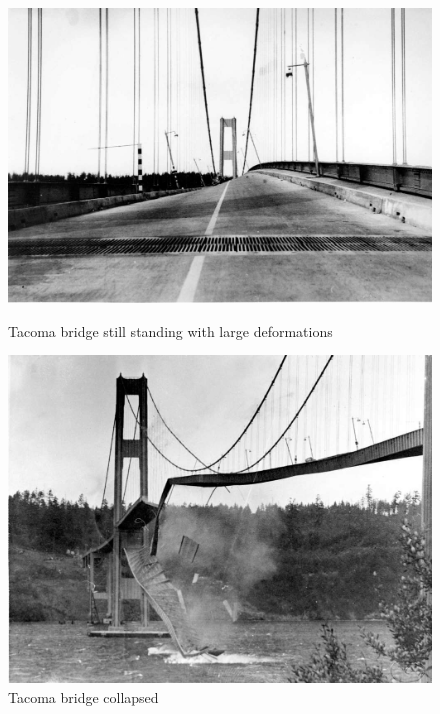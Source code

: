 \begin{figure}
\centering
\begin{minipage}{.51\textwidth}
  \centering
  \includegraphics[width=.95\linewidth]{./IntroductionToFSI/tacoma2.jpeg}
  \caption{Tacoma bridge still standing with large deformations}
  \label{fig:test1}
\end{minipage}%
\begin{minipage}{.50\textwidth}
  \centering
  \includegraphics[width=.95\linewidth]{./IntroductionToFSI/tacoma3.jpeg}
  \caption{Tacoma bridge collapsed}
  \label{fig:test2}
\end{minipage}
\end{figure}

